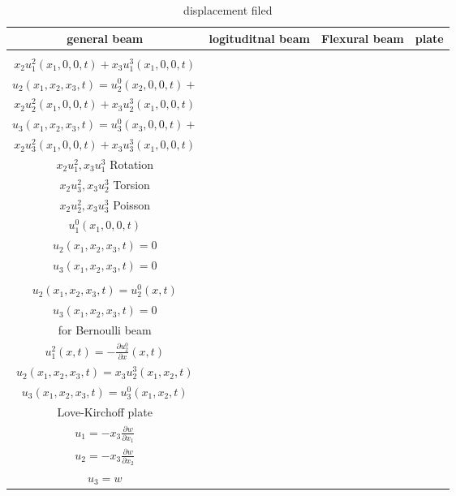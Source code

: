 \documentclass{article}
\begin{document}
\begin{multicols*}{2}
  \begin{table*}
    \centering
    \caption{displacement filed}
    \begin{tabular}{|c|c|c|c|}
      \hline
      general beam & logituditnal beam  & Flexural beam & plate\\
      \hline
      \makecell[c]{
        $u_{1}(x_{1},x_{2},x_{3},t)=u_{1}^{0}(x_{1},0,0,t)+$\\$x_{2}u_{1}^{2}(x_{1},0,0,t)+x_{3}u_{1}^{3}(x_{1},0,0,t)$\\
        $u_{2}(x_{1},x_{2},x_{3},t)=u_{2}^{0}(x_{2},0,0,t)+$\\$x_{2}u_{2}^{2}(x_{1},0,0,t)+x_{3}u_{2}^{3}(x_{1},0,0,t)$\\
        $u_{3}(x_{1},x_{2},x_{3},t)=u_{3}^{0}(x_{3},0,0,t)+$\\$x_{2}u_{3}^{2}(x_{1},0,0,t)+x_{3}u_{3}^{3}(x_{1},0,0,t)$\\
        $x_{2}u_1^2, x_{3}u_1^3$ Rotation \\
        $x_{2}u_3^2, x_{3}u_2^3$ Torsion \\
        $x_{2}u_2^2, x_{3}u_3^3$ Poisson
      }
      &\makecell[c]{
        $u_{1}(x_{1},x_{2},x_{3},t)=$\\$u_{1}^{0}(x_{1},0,0,t)$\\
        $u_{2}(x_{1},x_{2},x_{3},t)=0$\\
        $u_{3}(x_{1},x_{2},x_{3},t)=0$\\
      }
      &\makecell[c]{
        $u_{1}(x_{1},x_{2},x_{3},t)=x_{2}u_{1}^{2}(x_{1},t)$\\
        $u_{2}(x_{1},x_{2},x_{3},t)=u_{2}^{0}(x,t)$\\
        $u_{3}(x_{1},x_{2},x_{3},t)=0$\\
        for Bernoulli beam \\
        $u_{1}^{2}(x,t)=-\frac{\partial u_{2}^{0}}{\partial x}(x,t)$
      }
      &\makecell[c]{
        $u_{1}(x_{1},x_{2},x_{3},t)=x_{3}u_{1}^{3}(x_{1},x_{2},t)$\\
        $u_{2}(x_{1},x_{2},x_{3},t)=x_{3}u_{2}^{3}(x_{1},x_{2},t)$\\
        $u_{3}(x_{1},x_{2},x_{3},t)=u_{3}^{0}(x_{1},x_{2},t)$\\
        Love-Kirchoff plate\\
        $u_{1}=-x_{3}\frac{\partial w}{\partial x_{1}}$\\
        $u_{2}=-x_{3}\frac{\partial w}{\partial x_{2}}$\\
        $u_{3}=w$
      }\\
      \hline
    \end{tabular}
  \end{table*}

\end{multicols*}
\end{document}
